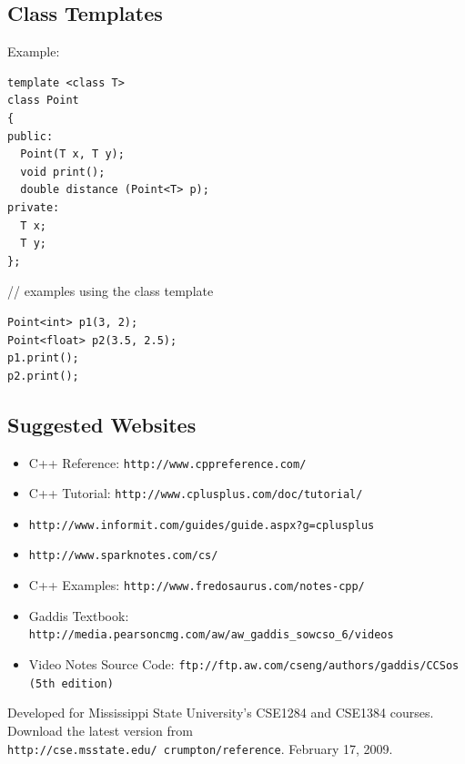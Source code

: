 \documentclass{article}
\begin{document}
\subsection*{Class Templates}
Example:
\begin{verbatim}
template <class T>
class Point
{
public:
  Point(T x, T y);
  void print();
  double distance (Point<T> p);
private:
  T x;
  T y;
};
\end{verbatim}
// examples using the class template
\begin{verbatim}
Point<int> p1(3, 2);
Point<float> p2(3.5, 2.5);
p1.print();
p2.print();
\end{verbatim}

\subsection*{Suggested Websites}
\begin{itemize}
    \item C++ Reference: \texttt{http://www.cppreference.com/}
    \item C++ Tutorial: \texttt{http://www.cplusplus.com/doc/tutorial/}
    \item \texttt{http://www.informit.com/guides/guide.aspx?g=cplusplus}
    \item \texttt{http://www.sparknotes.com/cs/}
    \item C++ Examples: \texttt{http://www.fredosaurus.com/notes-cpp/}
    \item Gaddis Textbook: \texttt{http://media.pearsoncmg.com/aw/aw\_gaddis\_sowcso\_6/videos}
    \item Video Notes Source Code: \texttt{ftp://ftp.aw.com/cseng/authors/gaddis/CCSos (5th edition)}
\end{itemize}
Developed for Mississippi State University's CSE1284 and CSE1384 courses.
Download the latest version from \texttt{http://cse.msstate.edu/~crumpton/reference}.
February 17, 2009.
\end{document}
